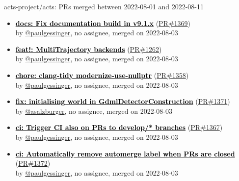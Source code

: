 \begin{frame}[allowframebreaks]{ acts-project/acts: PRs merged 
between 2022-08-01 and 2022-08-11
}
\begin{itemize}
    \item
    \prmerged\textbf{\href{https://github.com/acts-project/acts/pull/1369}{\textcolor{black}{docs: Fix documentation build in v9.1.x}}}
    (\href{https://github.com/acts-project/acts/pull/1369}{PR\#1369}) \\
    by \href{https://github.com/paulgessinger}{@paulgessinger}, {}no assignee, merged on 2022-08-03

    \item
    \prmerged\textbf{\href{https://github.com/acts-project/acts/pull/1262}{\textcolor{black}{feat!: MultiTrajectory backends}}}
    (\href{https://github.com/acts-project/acts/pull/1262}{PR\#1262}) \\
    by \href{https://github.com/paulgessinger}{@paulgessinger}, {}no assignee, merged on 2022-08-03

    \item
    \prmerged\textbf{\href{https://github.com/acts-project/acts/pull/1358}{\textcolor{black}{chore: clang-tidy modernize-use-nullptr}}}
    (\href{https://github.com/acts-project/acts/pull/1358}{PR\#1358}) \\
    by \href{https://github.com/paulgessinger}{@paulgessinger}, {}no assignee, merged on 2022-08-03

    \item
    \prmerged\textbf{\href{https://github.com/acts-project/acts/pull/1371}{\textcolor{black}{fix: initialising world in GdmlDetectorConstruction}}}
    (\href{https://github.com/acts-project/acts/pull/1371}{PR\#1371}) \\
    by \href{https://github.com/asalzburger}{@asalzburger}, {}no assignee, merged on 2022-08-03

    \item
    \prmerged\textbf{\href{https://github.com/acts-project/acts/pull/1367}{\textcolor{black}{ci: Trigger CI also on PRs to develop/* branches}}}
    (\href{https://github.com/acts-project/acts/pull/1367}{PR\#1367}) \\
    by \href{https://github.com/paulgessinger}{@paulgessinger}, {}no assignee, merged on 2022-08-03

    \item
    \prmerged\textbf{\href{https://github.com/acts-project/acts/pull/1372}{\textcolor{black}{ci: Automatically remove automerge label when PRs are closed}}}
    (\href{https://github.com/acts-project/acts/pull/1372}{PR\#1372}) \\
    by \href{https://github.com/paulgessinger}{@paulgessinger}, {}no assignee, merged on 2022-08-03


\end{itemize}
\end{frame}

